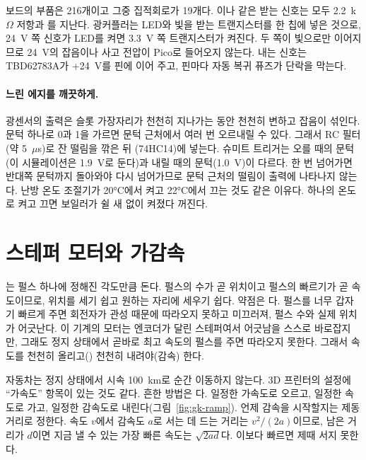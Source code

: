\Ours 보드의 부품은 216개이고 그중 집적회로가 19개다. 이나  같은 받는 신호는 모두
2.2~k$\Omega$ 저항과 를 지난다. 광커플러는 LED와 빛을 받는 트랜지스터를 한 칩에 넣은 것으로,
24~V 쪽 신호가 LED를 켜면 3.3~V 쪽 트랜지스터가 켜진다. 두 쪽이 빛으로만 이어지므로 24~V의 잡음이나 사고 전압이 Pico로
들어오지 않는다. 내는 신호는  TBD62783A가 +24~V를 핀에 이어 주고, 핀마다 자동 복귀
퓨즈가 단락을 막는다.

\paragraph{느린 에지를 깨끗하게.} 광센서의 출력은 슬롯 가장자리가 천천히 지나가는 동안 천천히 변하고 잡음이 섞인다.
문턱 하나로 0과 1을 가르면 문턱 근처에서 여러 번 오르내릴 수 있다. 그래서 RC 필터(약 5~$\mu$s)로 잔 떨림을 깎은 뒤
(74HC14)에 넣는다. 슈미트 트리거는 오를 때의 문턱(이 시뮬레이션은 1.9~V로 둔다)과
내릴 때의 문턱(1.0~V)이 다르다. 한 번 넘어가면 반대쪽 문턱까지 돌아와야 다시 넘어가므로 문턱 근처의 떨림이 출력에
나타나지 않는다. 난방 온도 조절기가 20°C에서 켜고 22°C에서 끄는 것도 같은 이유다. 하나의 온도로 켜고 끄면 보일러가
쉴 새 없이 켜졌다 꺼진다.

\section{스테퍼 모터와 가감속}\label{sec:gk-stepper}

\Why {}는 펄스 하나에 정해진 각도만큼 돈다. 펄스의 수가 곧 위치이고 펄스의 빠르기가 곧
속도이므로, 위치를 세기 쉽고 원하는 자리에 세우기 쉽다. 약점은 다. 펄스를 너무 갑자기
빠르게 주면 회전자가 관성 때문에 따라오지 못하고 미끄러져, 펄스 수와 실제 위치가 어긋난다. 이 기계의 모터는 엔코더가
달린  스테퍼여서 어긋남을 스스로 바로잡지만, 그래도 정지 상태에서 곧바로 최고 속도의
펄스를 주면 따라오지 못한다. 그래서 속도를 천천히 올리고() 천천히 내려야(감속) 한다.

\General 자동차는 정지 상태에서 시속 100~km로 순간 이동하지 않는다. 3D 프린터의 설정에 ``가속도'' 항목이 있는 것도 같다.
흔한 방법은 다. 일정한 가속도로 오르고, 일정한 속도로 가고, 일정한 감속도로
내린다(그림~\ref{fig:gk-ramp}). 언제 감속을 시작할지는 제동 거리로 정한다. 속도 $v$에서 감속도 $a$로 서는 데 드는 거리는
$v^2 / (2a)$이므로, 남은 거리가 $d$이면 지금 낼 수 있는 가장 빠른 속도는 $\sqrt{2ad}$다. 이보다 빠르면 제때 서지 못한다.

